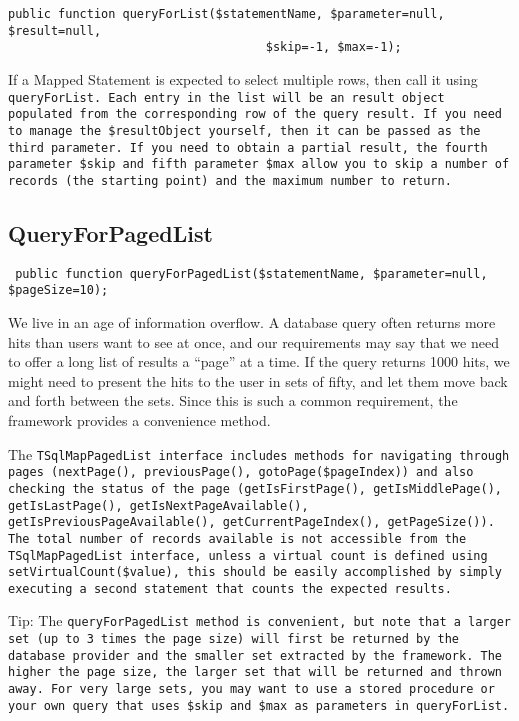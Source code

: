 \begin{verbatim}
public function queryForList($statementName, $parameter=null, $result=null,
                                    $skip=-1, $max=-1);
\end{verbatim}
If a Mapped Statement is expected to select multiple rows, then call it using
\tt{queryForList}. Each entry in the list will be an result object populated
from the corresponding row of the query result. If you need to manage the
\tt{\$resultObject} yourself, then it can be passed as the third parameter. If
you need to obtain a partial result, the fourth parameter \tt{\$skip} and
fifth parameter \tt{\$max} allow you to skip a number of records (the starting
point) and the maximum number to return.


\subsection{QueryForPagedList}
\begin{verbatim}
 public function queryForPagedList($statementName, $parameter=null, $pageSize=10);
\end{verbatim}
We live in an age of information overflow. A database query often returns more
hits than users want to see at once, and our requirements may say that we need
to offer a long list of results a ``page'' at a time. If the query returns
1000 hits, we might need to present the hits to the user in sets of fifty, and
let them move back and forth between the sets. Since this is such a common
requirement, the framework provides a convenience method.

The \tt{TSqlMapPagedList} interface includes methods for navigating through
pages (\tt{nextPage()}, \tt{previousPage()}, \tt{gotoPage(\$pageIndex)}) and
also checking the status of the page (\tt{getIsFirstPage()},
\tt{getIsMiddlePage()}, \tt{getIsLastPage()}, \tt{getIsNextPageAvailable()},
\tt{getIsPreviousPageAvailable()}, \tt{getCurrentPageIndex()},
\tt{getPageSize()}). The total number of records available is not accessible
from the \tt{TSqlMapPagedList} interface, unless a virtual count is defined
using \tt{setVirtualCount(\$value)}, this should be easily accomplished by
simply executing a second statement that counts the expected results.

\begin{mybox}{Tip:}
The \tt{queryForPagedList} method is convenient, but note that a larger set
(up to 3 times the page size) will first be returned by the database provider
and the smaller set extracted by the framework. The higher the page size, the
larger set that will be returned and thrown away. For very large sets, you may
want to use a stored procedure or your own query that uses \tt{\$skip} and
\tt{\$max} as parameters in \tt{queryForList}.
\end{mybox}

